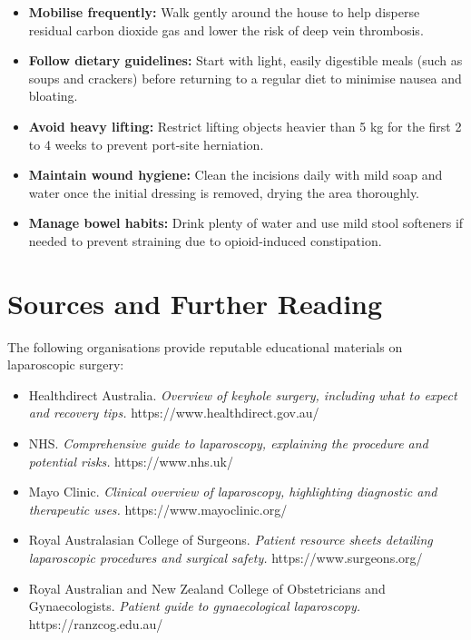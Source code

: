 \begin{itemize}
    \item \textbf{Mobilise frequently:} Walk gently around the house to help disperse residual carbon dioxide gas and lower the risk of deep vein thrombosis.
    \item \textbf{Follow dietary guidelines:} Start with light, easily digestible meals (such as soups and crackers) before returning to a regular diet to minimise nausea and bloating.
    \item \textbf{Avoid heavy lifting:} Restrict lifting objects heavier than 5 kg for the first 2 to 4 weeks to prevent port-site herniation.
    \item \textbf{Maintain wound hygiene:} Clean the incisions daily with mild soap and water once the initial dressing is removed, drying the area thoroughly.
    \item \textbf{Manage bowel habits:} Drink plenty of water and use mild stool softeners if needed to prevent straining due to opioid-induced constipation.
\end{itemize}

\section*{Sources and Further Reading}
The following organisations provide reputable educational materials on laparoscopic surgery:

\begin{itemize}
    \item Healthdirect Australia. \textit{Overview of keyhole surgery, including what to expect and recovery tips.} https://www.healthdirect.gov.au/
    \item NHS. \textit{Comprehensive guide to laparoscopy, explaining the procedure and potential risks.} https://www.nhs.uk/
    \item Mayo Clinic. \textit{Clinical overview of laparoscopy, highlighting diagnostic and therapeutic uses.} https://www.mayoclinic.org/
    \item Royal Australasian College of Surgeons. \textit{Patient resource sheets detailing laparoscopic procedures and surgical safety.} https://www.surgeons.org/
    \item Royal Australian and New Zealand College of Obstetricians and Gynaecologists. \textit{Patient guide to gynaecological laparoscopy.} https://ranzcog.edu.au/
\end{itemize}
